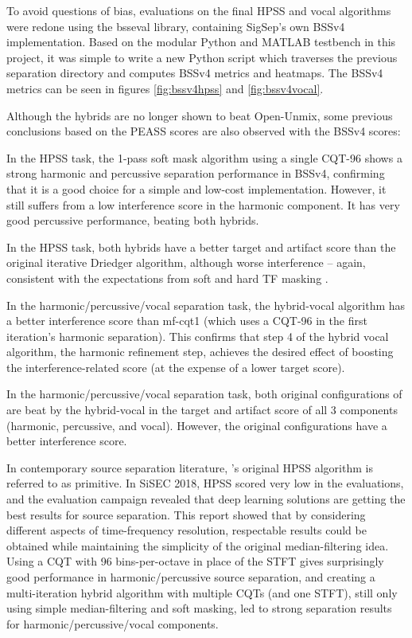 \documentclass[letter,12pt]{article}
\newenvironment{tight_itemize}{
\begin{itemize}
  \setlength{\itemsep}{0pt}
  \setlength{\parskip}{0pt}
}{\end{itemize}}
\begin{document}
To avoid questions of bias, evaluations on the final HPSS and vocal algorithms were redone using the bsseval library, containing SigSep's own BSSv4 implementation. Based on the modular Python and MATLAB testbench in this project, it was simple to write a new Python script which traverses the previous separation directory and computes BSSv4 metrics and heatmaps. The BSSv4 metrics can be seen in figures \ref{fig:bssv4hpss} and \ref{fig:bssv4vocal}.

Although the hybrids are no longer shown to beat Open-Unmix, some previous conclusions based on the PEASS scores are also observed with the BSSv4 scores:

\begin{tight_itemize}
	\item
		In the HPSS task, the 1-pass soft mask algorithm using a single CQT-96 shows a strong harmonic and percussive separation performance in BSSv4, confirming that it is a good choice for a simple and low-cost implementation. However, it still suffers from a low interference score in the harmonic component. It has very good percussive performance, beating both hybrids.
	\item
		In the HPSS task, both hybrids have a better target and artifact score than the original iterative Driedger algorithm, although worse interference -- again, consistent with the expectations from soft and hard TF masking \cite{masking}.
	\item
		In the harmonic/percussive/vocal separation task, the hybrid-vocal algorithm has a better interference score than mf-cqt1 (which uses a CQT-96 in the first iteration's harmonic separation). This confirms that step 4 of the hybrid vocal algorithm, the harmonic refinement step, achieves the desired effect of boosting the interference-related score (at the expense of a lower target score).
	\item
		In the harmonic/percussive/vocal separation task, both original configurations of \citet{fitzgerald2} are beat by the hybrid-vocal in the target and artifact score of all 3 components (harmonic, percussive, and vocal). However, the original configurations have a better interference score.
\end{tight_itemize}

In contemporary source separation literature\cite{nussl}, \citet{fitzgerald1}'s original HPSS algorithm is referred to as primitive. In SiSEC 2018\cite{sigsep2018}, HPSS scored very low in the evaluations, and the evaluation campaign revealed that deep learning solutions are getting the best results for source separation. This report showed that by considering different aspects of time-frequency resolution, respectable results could be obtained while maintaining the simplicity of the original median-filtering idea. Using a CQT with 96 bins-per-octave in place of the STFT gives surprisingly good performance in harmonic/percussive source separation, and creating a multi-iteration hybrid algorithm with multiple CQTs (and one STFT), still only using simple median-filtering and soft masking, led to strong separation results for harmonic/percussive/vocal components.
\end{document}
